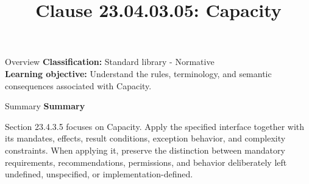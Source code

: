 \documentclass[10pt,letterpaper]{article}
\title{Clause 23.04.03.05: Capacity}
\author{}
\date{}
\begin{document}
\maketitle
\begin{CornellOverviewBox}{Overview}
\textbf{Classification:} Standard library - Normative\\[2pt]
\textbf{Learning objective:} Understand the rules, terminology, and semantic consequences associated with Capacity.
\end{CornellOverviewBox}\begin{CornellSummaryBox}{Summary}
{\sffamily\bfseries\color{Accent} Summary}\par\vspace{3pt}Section 23.4.3.5 focuses on Capacity. Apply the specified interface together with its mandates, effects, result conditions, exception behavior, and complexity constraints. When applying it, preserve the distinction between mandatory requirements, recommendations, permissions, and behavior deliberately left undefined, unspecified, or implementation-defined.
\end{CornellSummaryBox}
\end{document}
